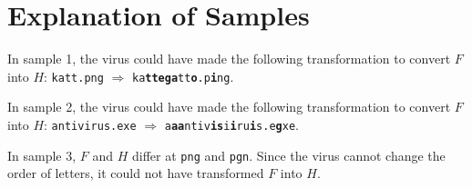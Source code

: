\section*{Explanation of Samples}
In sample 1, the virus could have made the following transformation to convert $F$ into $H$:
\texttt{katt.png} $\Rightarrow$ \texttt{ka\textbf{ttega}tt\textbf{o}.p\textbf{i}ng}.


In sample 2, the virus could have made the following transformation to convert $F$ into $H$:
\texttt{antivirus.exe} $\Rightarrow$ \texttt{a\textbf{aa}ntiv\textbf{is}i\textbf{i}ru\textbf{i}s.e\textbf{g}xe}.


In sample 3, $F$ and $H$ differ at \texttt{png} and \texttt{pgn}. Since the virus cannot change the order of letters, it could not have transformed $F$ into $H$.
